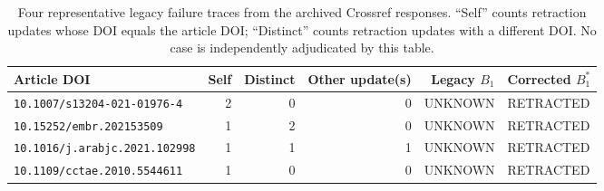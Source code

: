 \begin{table}[t]
\centering\small
\caption{Four representative legacy failure traces from the archived Crossref responses. ``Self'' counts retraction updates whose DOI equals the article DOI; ``Distinct'' counts retraction updates with a different DOI. No case is independently adjudicated by this table.}
\label{tab:cases}
\begin{tabular}{lrrrrl}
\toprule
Article DOI & Self & Distinct & Other update(s) & Legacy $B_1$ & Corrected $B_1^*$ \\
\midrule
\texttt{10.1007/s13204-021-01976-4} & 2 & 0 & 0 & UNKNOWN & RETRACTED \\
\texttt{10.15252/embr.202153509} & 1 & 2 & 0 & UNKNOWN & RETRACTED \\
\texttt{10.1016/j.arabjc.2021.102998} & 1 & 1 & 1 & UNKNOWN & RETRACTED \\
\texttt{10.1109/cctae.2010.5544611} & 1 & 0 & 0 & UNKNOWN & RETRACTED \\
\bottomrule
\end{tabular}
\end{table}